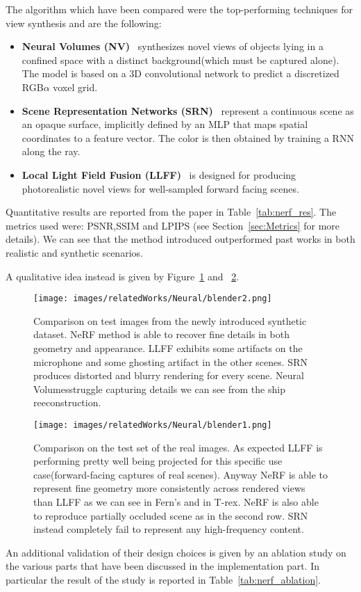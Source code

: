The algorithm which have been compared were the top-performing techniques for view synthesis and 
are the following:
\begin{itemize}
    \item \textbf{Neural Volumes (NV)}~\cite{neuralvol} synthesizes novel views of objects
    lying in a confined space with a distinct background(which must be captured alone).
    The model is based on a 3D convolutional network to predict a discretized RGB$\alpha$ voxel grid.
    \item \textbf{Scene Representation Networks (SRN)}~\cite{srn} represent a continuous scene
    as an opaque surface, implicitly defined by an MLP that maps spatial coordinates to a
    feature vector. The color is then obtained by training a RNN along the ray.
    \item \textbf{Local Light Field Fusion (LLFF)}~\cite{LLFF} is designed for producing photorealistic
    novel views for well-sampled forward facing scenes.
\end{itemize}
Quantitative results are reported from the paper in Table~\ref{tab:nerf_res}.
The metrics used were: PSNR,SSIM and LPIPS (see Section~\ref{sec:Metrics} for more details).
We can see that the method introduced outperformed past works in both realistic and 
synthetic scenarios.



A qualitative idea instead is given by Figure~\ref{fig:blender2} and ~\ref{fig:blender1}.
\begin{figure}[H]
    \centering
    \texttt{[image: images/relatedWorks/Neural/blender2.png]} 
    \caption{Comparison on test images from the newly introduced
    synthetic dataset. NeRF method is able to recover fine details in both geometry
    and appearance. LLFF exhibits some artifacts on the microphone and some ghosting
    artifact in the other scenes. SRN produces distorted and blurry rendering for every
    scene. Neural Volumesstruggle capturing details we can see from
    the ship reeconstruction.}\label{fig:blender2}
\end{figure}

\begin{figure}[H]
    \centering
    \texttt{[image: images/relatedWorks/Neural/blender1.png]} 
    \caption{Comparison on the test set of the real images.
    As expected LLFF is performing pretty well being projected
    for this specific use case(forward-facing captures of real scenes).
    Anyway NeRF is able to represent fine geometry more consistently across
    rendered views than LLFF as we can see in Fern's and in T-rex. NeRF
    is also able to reproduce partially occluded scene as in the second row.
    SRN instead completely fail to represent any high-frequency content.}\label{fig:blender1}
\end{figure}
An additional validation of their design choices is given by an ablation
study on the various parts that have been discussed in the implementation part.
In particular the result of the study is reported in Table~\ref{tab:nerf_ablation}.


